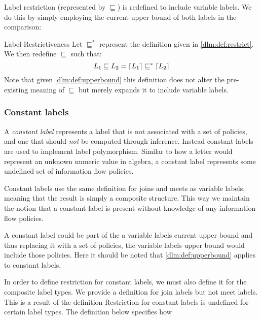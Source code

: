 Label restriction (represented by $\sqsubseteq$) is redefined to include variable labels.
We do this by simply employing the current upper bound of both labels in the comparison:
\begin{definition}{Label Restrictiveness}\label{dlm:def:restrictupperbound}
  Let $\sqsubseteq^*$ represent the definition given in \cref{dlm:def:restrict}.
  We then redefine $\sqsubseteq$ such that:
  \[
    L_1 \sqsubseteq L_2 = \lceil L_1\rceil \sqsubseteq^* \lceil L_2\rceil
  \]
  Note that given \cref{dlm:def:upperbound} this definition does not alter the pre-existing meaning of $\sqsubseteq$ but merely expands it to include variable labels.
\end{definition}

\subsubsection{Constant labels}
A \textit{constant label} represents a label that is not associated with a set of policies, and one that should \textit{not} be computed through inference.
Instead constant labels are used to implement label polymorphism.
Similar to how a letter would represent an unknown numeric value in algebra, a constant label represents some undefined set of information flow policies.

Constant labels use the same definition for joins and meets as variable labels, meaning that the result is simply a composite structure.
This way we maintain the notion that a constant label is present without knowledge of any information flow policies.

A constant label could be part of the a variable labels current upper bound and thus replacing it with a set of policies, the variable labels upper bound would include those policies.
Here it should be noted that \cref{dlm:def:upperbound} applies to constant labels.

In order to define restriction for constant labels, we must also define it for the composite label types.
We provide a definition for join labels but not meet labels.
This is a result of the definition
Restriction for constant labels is undefined for certain label types.
The definition below specifies how

